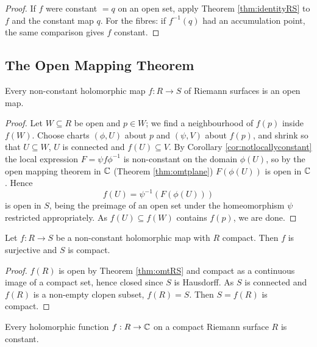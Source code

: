 \documentclass[a4paper]{scrartcl}
\begin{document}
\begin{proof}
	If $f$ were constant $= q$ on an open set, apply Theorem \ref{thm:identityRS} to $f$ and
	the constant map $q$. For the fibres: if $f^{-1}(q)$ had an accumulation point, the same
	comparison gives $f$ constant.
\end{proof}

\subsection{The Open Mapping Theorem}

\begin{theorem}\label{thm:omtRS}
	Every non-constant holomorphic map $f : R \to S$ of Riemann surfaces is an open map.
\end{theorem}

\begin{proof}
	Let $W \subseteq R$ be open and $p \in W$; we find a neighbourhood of $f(p)$ inside
	$f(W)$. Choose charts $(\phi, U)$ about $p$ and $(\psi, V)$ about $f(p)$, and shrink so
	that $U \subseteq W$, $U$ is connected and $f(U) \subseteq V$. By Corollary
	\ref{cor:notlocallyconstant} the local expression $F = \psi f \phi^{-1}$ is non-constant
	on the domain $\phi(U)$, so by the open mapping theorem in $\mathbb{C}$ (Theorem
	\ref{thm:omtplane}) $F(\phi(U))$ is open in $\mathbb{C}$. Hence
	$$
	f(U) = \psi^{-1}\left(F(\phi(U))\right)
	$$
	is open in $S$, being the preimage of an open set under the homeomorphism $\psi$
	restricted appropriately. As $f(U) \subseteq f(W)$ contains $f(p)$, we are done.
\end{proof}

\begin{corollary}\label{cor:compactsurjective}
	Let $f : R \to S$ be a non-constant holomorphic map with $R$ compact. Then $f$ is
	surjective and $S$ is compact.
\end{corollary}

\begin{proof}
	$f(R)$ is open by Theorem \ref{thm:omtRS} and compact as a continuous image of a
	compact set, hence closed since $S$ is Hausdorff. As $S$ is connected and $f(R)$ is a
	non-empty clopen subset, $f(R) = S$. Then $S = f(R)$ is compact.
\end{proof}

\begin{corollary}\label{cor:noholofnsoncompact}
	Every holomorphic function $f : R \to \mathbb{C}$ on a compact Riemann surface $R$ is constant.
\end{corollary}
\end{document}
